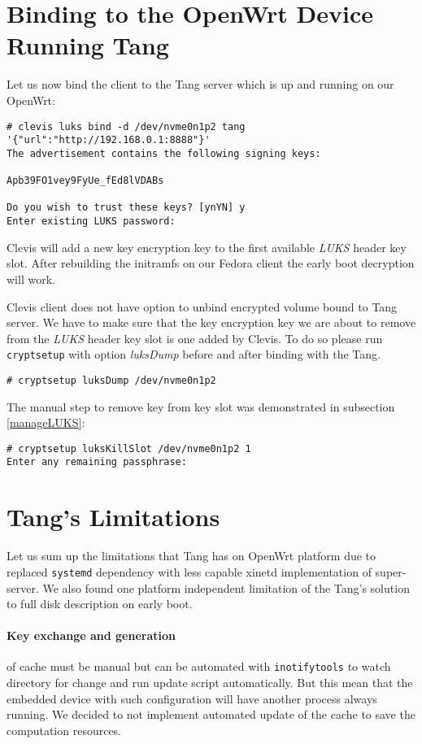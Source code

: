 \section{Binding to the OpenWrt Device Running Tang}
Let us now bind the client to the Tang server which is up and running on our OpenWrt:
\begin{lstlisting}[columns=fixed,basicstyle=\ttfamily\footnotesize,tabsize=4,backgroundcolor=\color{yellow!10}]
# clevis luks bind -d /dev/nvme0n1p2 tang '{"url":"http://192.168.0.1:8888"}'
The advertisement contains the following signing keys:

Apb39FO1vey9FyUe_fEd8lVDABs

Do you wish to trust these keys? [ynYN] y
Enter existing LUKS password:
\end{lstlisting}
Clevis will add a new key encryption key to the first available {\it LUKS} header key slot.
After rebuilding the initramfs on our Fedora client the early boot decryption will work.

Clevis client does not have option to unbind encrypted volume bound to Tang server.
We have to make sure that the key encryption key we are about to remove from the {\it LUKS} header key slot is one added by Clevis.
To do so please run {\tt cryptsetup} with option {\it luksDump} before and after binding with the Tang.
\begin{lstlisting}[columns=fixed,basicstyle=\ttfamily\footnotesize,tabsize=4,backgroundcolor=\color{yellow!10}]
# cryptsetup luksDump /dev/nvme0n1p2
\end{lstlisting}
The manual step to remove key from key slot was demonstrated in subsection \ref{manageLUKS}:
\begin{lstlisting}[columns=fixed,basicstyle=\ttfamily\footnotesize,tabsize=4,backgroundcolor=\color{yellow!10}]
# cryptsetup luksKillSlot /dev/nvme0n1p2 1
Enter any remaining passphrase:
\end{lstlisting}

\section{Tang's Limitations}\label{limitations}

Let us sum up the limitations that Tang has on OpenWrt platform due to replaced {\tt systemd} dependency with less capable xinetd implementation of super-server.
We also found one platform independent limitation of the Tang's solution to full disk description on early boot.

\paragraph{Key exchange and generation} of cache must be manual but  can be automated with {\tt inotifytools} to watch directory for change and run update script automatically.
But this mean that the embedded device with such configuration will have another process always running.
We decided to not implement automated update of the cache to save the computation resources.

